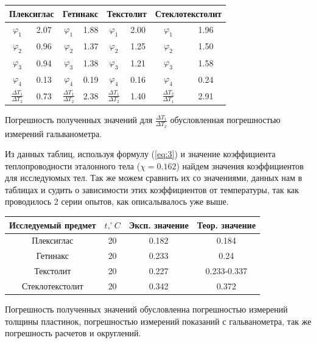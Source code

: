 \documentclass[a4paper,11.5pt]{article} %
\begin{document}
\begin{center}
\begin{tabular}{|c|c|c|c|c|c|c|c|}
\hline 
\multicolumn{2}{|c|}{Плексиглас} & \multicolumn{2}{c|}{Гетинакс} & \multicolumn{2}{c|}{Текстолит} & \multicolumn{2}{c|}{Стеклотекстолит} \\ 
\hline 
$\varphi_1$ & 2.07 & $\varphi_1$ & 1.88 & $\varphi_1$ & 2.00 & $\varphi_1$ & 1.96 \\ 
\hline 
$\varphi_2$ & 0.96 & $\varphi_2$ & 1.37 & $\varphi_2$ & 1.25 & $\varphi_2$ & 1.50 \\ 
\hline 
$\varphi_3$ & 0.94 & $\varphi_3$ & 1.38 & $\varphi_3$ & 1.21 & $\varphi_3$ & 1.58 \\ 
\hline 
$\varphi_4$ & 0.13 & $\varphi_4$ & 0.19 & $\varphi_4$ & 0.16 & $\varphi_4$ & 0.24 \\ 
\hline 
$\frac{\Delta T_1}{\Delta T_2}$ & 0.73 & $\frac{\Delta T_1}{\Delta T_2}$ & 2.38 & $\frac{\Delta T_1}{\Delta T_2}$ & 1.40 & $\frac{\Delta T_2}{\Delta T_1}$ & 2.91 \\
\hline
\end{tabular}
\end{center}

Погрешность полученных значений для $\frac{\Delta T_1}{\Delta T_2}$ обусловленная погрешностью измерений гальванометра. 

Из данных таблиц, используя формулу (\ref{eq:3}) и значение коэффициента теплопроводности эталонного тела ($\chi = 0.162$) найдем значения коэффициентов для исследуюмых тел. Так же можем сравнить их со значениями, данных нам в таблицах и судить о зависимости этих коэффициентов от температуры, так как проводилось 2 серии опытов, как описалывалось уже выше.

\begin{center}
\begin{tabular}{|c|c|c|c|}
\hline 
Исследуемый предмет & $t, ^\circ C$ & Эксп. значение & Теор. значение \\ 
\hline 
Плексиглас & 20 & 0.182 & 0.184 \\ 
\hline 
Гетинакс   & 20 & 0.233 & 0.24 \\ 
\hline 
Текстолит  & 20 & 0.227 & 0.233-0.337 \\ 
\hline 
Стеклотекстолит & 20 & 0.342 & 0.372 \\ 
\hline 
\end{tabular} 
\end{center}

Погрешность полученных значений обусловленна погрешностью измерений толщины пластинок, погрешностью измерений показаний с гальванометра, так же погрешность расчетов и округлений.
\end{document}
